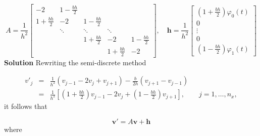 \documentclass[12pt,a4paper]{article}
\begin{document}
\[
A = \frac{1}{h^2}\begin{bmatrix}
-2 & 1 - \frac{bh}{2} & & & \\
1 + \frac{bh}{2}  & -2 & 1 - \frac{bh}{2}  & & \\
      & \ddots & \ddots & \ddots & \\
      &        & 1 + \frac{bh}{2}    & -2 & 1 - \frac{bh}{2} \\
      &        &        &1 + \frac{bh}{2}      & -2
\end{bmatrix}, \quad
\mathbf{h} = \frac{1}{h^2}\left[\begin{array}{c} 
{} \left(1 + \frac{bh}{2}\right)\varphi_0(t)\\
0 \\
\vdots \\
0 \\
\left(1 - \frac{bh}{2}\right)\varphi_1(t)
\end{array}
\right]
\]
\textbf{Solution} Rewriting the semi-discrete method


\begin{eqnarray*}
v'_j &=& \frac{1}{h^2}\left(v_{j-1} - 2v_j + v_{j+1}   \right) - \frac{b}{2h}\left(v_{j+1}  - v_{j-1}   \right) \\
&=& \frac{1}{h^2}\left[ \left(1 + \frac{bh}{2}\right)v_{j-1} - 2v_j +  \left(1 - \frac{bh}{2}\right)v_{j+1}  \right],\qquad j = 1, \ldots, n_x,
\end{eqnarray*}
it follows that


\begin{equation*}
\mathbf{v}' = A\mathbf{v} + \mathbf{h}
\end{equation*}
where
\end{document}

